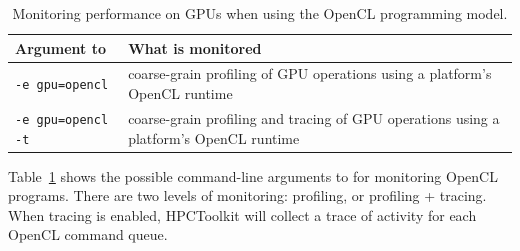 \begin{table}[h]
\centering
\begin{tabular}{|l|p{3.5in}|}\hline
Argument to \hpcrun{} & What is monitored\\\hline\hline
{\tt -e gpu=opencl} & coarse-grain profiling of  GPU operations using a platform's OpenCL runtime\\\hline
{\tt -e gpu=opencl -t} & coarse-grain profiling and tracing of  GPU operations using a platform's OpenCL runtime\\\hline
\end{tabular}
\caption{Monitoring performance on GPUs when using the OpenCL programming model.}
\label{opencl-monitoring-options}
\end{table}


Table~\ref{opencl-monitoring-options} shows the possible command-line arguments to \hpcrun{} for monitoring  OpenCL programs. There are two levels of monitoring: profiling, or profiling + tracing. When tracing is enabled,  HPCToolkit will collect a trace of activity for each OpenCL command queue.
